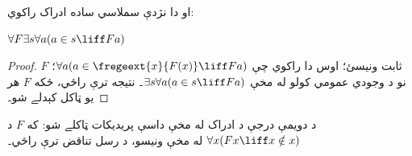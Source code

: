 \documentclass[../../../include/open-logic-section]{subfiles}
\begin{document}
او دا نژدې سملاسي ساده ادراک راکوي:

\begin{lem}
$\forall F \exists s \forall a (a \in s \liff Fa)$
\end{lem}

\begin{proof}
$F$ ثابت ونيسئ؛ اوس  دا راکوي چې $\forall a (a \in
\fregeext{x}{F(x)} \liff Fa)$؛ نو د وجودي عمومي کولو له مخې $\exists s\forall a(a \in s \liff Fa)$۔
نتيجه ترې راځي، ځکه $F$ هر يو ټاکل کېدلے شو۔
\end{proof}

د دويمې درجې د ادراک له مخې داسې پريديکات ټاکلے شو:
که $F$ د $\forall x(Fx \liff x \notin x)$ له مخې ونيسو، د رسل تناقض ترې راځي۔
\end{document}
